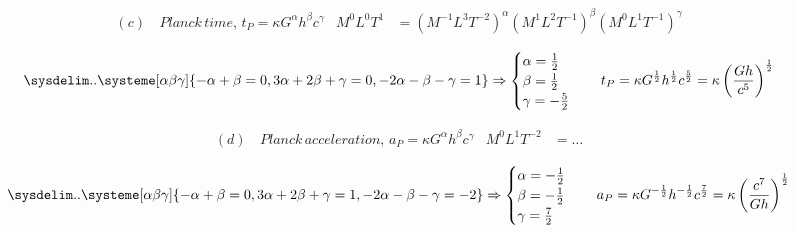 \documentclass[]{article}
\begin{document}
{		\clearpage	
						
			\begin{equation*}
				\begin{aligned}
					(c) & \, Planck \, time, \, t_P = \kappa G^{\alpha} h^{\beta} c^{\gamma}  & M^0 L^0 T^1 &= (M^{-1} L^3 T^{-2})^{\alpha} (M^1 L^2 T^{-1})^{\beta} (M^0 L^1 T^{-1})^{\gamma}
					\\
				\end{aligned}
			\end{equation*}
				\begin{equation*}
					\sysdelim..\systeme[\alpha\beta\gamma]{
						-\alpha + \beta = 0, 
						3\alpha + 2\beta + \gamma = 0,
						-2\alpha - \beta - \gamma = 1
					} \Rightarrow
					\begin{cases}
						\alpha = \frac{1}{2} \\
						\beta = \frac{1}{2} \\
						\gamma = -\frac{5}{2}
					\end{cases}
					\quad
					t_P = \kappa G^{\frac{1}{2}} h^{\frac{1}{2}} c^{\frac{5}{2}} = \kappa \left( \frac{Gh}{c^5} \right)^\frac{1}{2}
				\end{equation*}
			
			\begin{equation*}	
				\begin{aligned}
					(d) & \, Planck \, acceleration, \, a_P = \kappa G^{\alpha} h^{\beta} c^{\gamma}  & M^0 L^1 T^{-2} &= \dots
					\\
				\end{aligned}
			\end{equation*}
				\begin{equation*}
					\sysdelim..\systeme[\alpha\beta\gamma]{
						-\alpha + \beta = 0, 
						3\alpha + 2\beta + \gamma = 1,
						-2\alpha - \beta - \gamma = -2
					} \Rightarrow
					\begin{cases}
						\alpha = -\frac{1}{2} \\
						\beta = -\frac{1}{2} \\
						\gamma = \frac{7}{2}
					\end{cases}
					\quad
					a_P = \kappa G^{-\frac{1}{2}} h^{-\frac{1}{2}} c^{\frac{7}{2}} = \kappa \left( \frac{c^7}{Gh} \right)^\frac{1}{2}
				\end{equation*}
			
}
\end{document}
